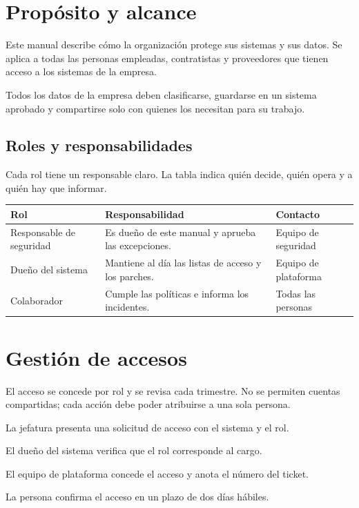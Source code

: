 \section{Propósito y alcance}
Este manual describe cómo la organización protege sus sistemas y sus datos.
Se aplica a todas las personas empleadas, contratistas y proveedores que tienen
acceso a los sistemas de la empresa.

\begin{policybox}
  Todos los datos de la empresa deben clasificarse, guardarse en un sistema
  aprobado y compartirse solo con quienes los necesitan para su trabajo.
\end{policybox}

\subsection{Roles y responsabilidades}
Cada rol tiene un responsable claro. La tabla indica quién decide, quién opera y
a quién hay que informar.

\begin{table}[H]
  \centering
  \begin{tabularx}{\linewidth}{@{}lXl@{}}
    \toprule
    \textbf{Rol} & \textbf{Responsabilidad} & \textbf{Contacto} \\
    \midrule
    Responsable de seguridad & Es dueño de este manual y aprueba las excepciones. & Equipo de seguridad \\
    Dueño del sistema & Mantiene al día las listas de acceso y los parches. & Equipo de plataforma \\
    Colaborador & Cumple las políticas e informa los incidentes. & Todas las personas \\
    \bottomrule
  \end{tabularx}
\end{table}

\section{Gestión de accesos}
El acceso se concede por rol y se revisa cada trimestre. No se permiten cuentas
compartidas; cada acción debe poder atribuirse a una sola persona.

\begin{procedurebox}
  \begin{steps}
    \item La jefatura presenta una solicitud de acceso con el sistema y el rol.
    \item El dueño del sistema verifica que el rol corresponde al cargo.
    \item El equipo de plataforma concede el acceso y anota el número del ticket.
    \item La persona confirma el acceso en un plazo de dos días hábiles.
  \end{steps}
\end{procedurebox}

